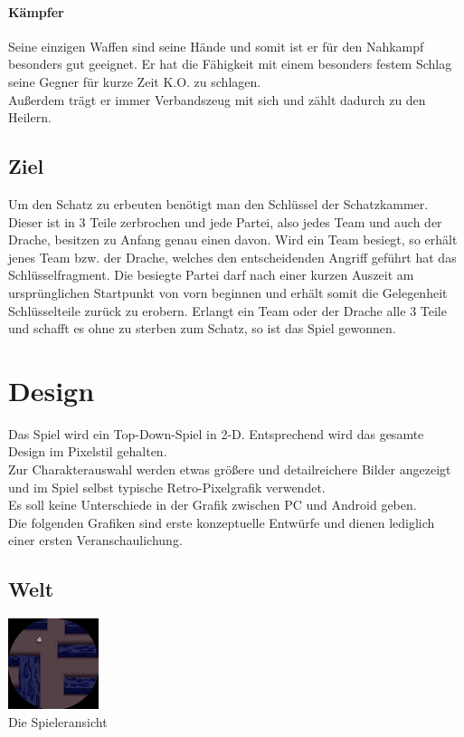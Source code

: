 \documentclass[10pt,a4paper,notitlepage]{report}
\begin{document}
\begin{flushleft}
\subsubsection{Kämpfer}
Seine einzigen Waffen sind seine Hände und somit ist er für den Nahkampf besonders gut geeignet. Er hat die Fähigkeit mit einem besonders festem Schlag seine Gegner für kurze Zeit K.O. zu schlagen.\\
Außerdem trägt er immer Verbandszeug mit sich und zählt dadurch zu den Heilern.\\
\section{Ziel}
Um den Schatz zu erbeuten benötigt man den Schlüssel der Schatzkammer. Dieser ist in 3 Teile zerbrochen und jede Partei, also jedes Team und auch der Drache, besitzen zu Anfang genau einen davon. Wird ein Team besiegt, so erhält jenes Team bzw. der Drache, welches den entscheidenden Angriff geführt hat das Schlüsselfragment. Die besiegte Partei darf nach einer kurzen Auszeit am ursprünglichen Startpunkt von vorn beginnen und erhält somit die Gelegenheit Schlüsselteile zurück zu erobern. Erlangt ein Team oder der Drache alle 3 Teile und schafft es ohne zu sterben zum Schatz, so ist das Spiel gewonnen.\\

\chapter{Design}
Das Spiel wird ein Top-Down-Spiel in 2-D. Entsprechend wird das gesamte Design im Pixelstil gehalten.\\
Zur Charakterauswahl werden etwas größere und detailreichere Bilder angezeigt und im Spiel selbst typische Retro-Pixelgrafik verwendet.\\
Es soll keine Unterschiede in der Grafik zwischen PC und Android geben.\\
Die folgenden Grafiken sind erste konzeptuelle Entwürfe und dienen lediglich einer ersten Veranschaulichung.\\

\section{Welt}
	\begin{center}
			\includegraphics[scale=3]{Maze.jpg}\\
		Die Spieleransicht\\
	\end{center}


\end{flushleft}
\end{document}
